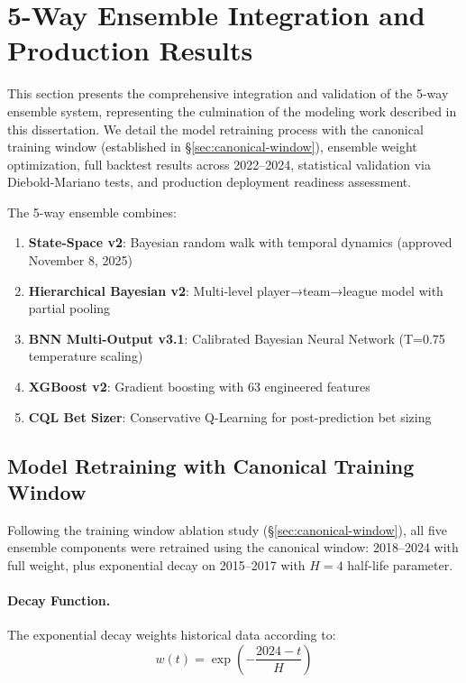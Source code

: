 \section{5-Way Ensemble Integration and Production Results}
\label{sec:5way-ensemble-production}

This section presents the comprehensive integration and validation of the 5-way ensemble system, representing the culmination of the modeling work described in this dissertation. We detail the model retraining process with the canonical training window (established in \S\ref{sec:canonical-window}), ensemble weight optimization, full backtest results across 2022--2024, statistical validation via Diebold-Mariano tests, and production deployment readiness assessment.

The 5-way ensemble combines:
\begin{enumerate}
  \item \textbf{State-Space v2}: Bayesian random walk with temporal dynamics (approved November 8, 2025)
  \item \textbf{Hierarchical Bayesian v2}: Multi-level player→team→league model with partial pooling
  \item \textbf{BNN Multi-Output v3.1}: Calibrated Bayesian Neural Network (T=0.75 temperature scaling)
  \item \textbf{XGBoost v2}: Gradient boosting with 63 engineered features
  \item \textbf{CQL Bet Sizer}: Conservative Q-Learning for post-prediction bet sizing
\end{enumerate}

\subsection{Model Retraining with Canonical Training Window}
\label{subsec:retraining-canonical}

Following the training window ablation study (\S\ref{sec:canonical-window}), all five ensemble components were retrained using the canonical window: 2018--2024 with full weight, plus exponential decay on 2015--2017 with $H=4$ half-life parameter.

\paragraph{Decay Function.}
The exponential decay weights historical data according to:
\begin{equation}
  w(t) = \exp\left(-\frac{2024 - t}{H}\right)
\end{equation}

